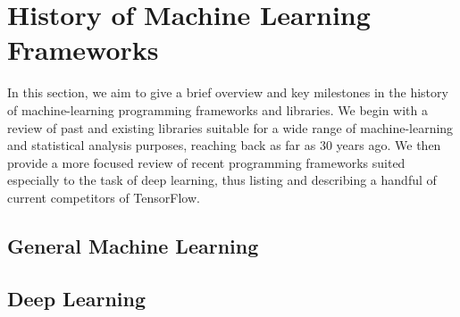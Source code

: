 
\section{History of Machine Learning Frameworks}

In this section, we aim to give a brief overview and key milestones in the
history of machine-learning programming frameworks and libraries. We begin with
a review of past and existing libraries suitable for a wide range of
machine-learning and statistical analysis purposes, reaching back as far as 30
years ago. We then provide a more focused review of recent programming
frameworks suited especially to the task of deep learning, thus listing and
describing a handful of current competitors of TensorFlow.

\subsection{General Machine Learning}

\subsection{Deep Learning}

